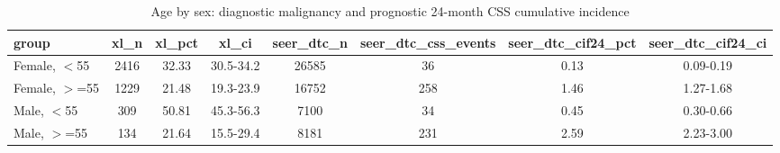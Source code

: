 \begin{table}[htbp]
\caption{Age by sex: diagnostic malignancy and prognostic 24-month CSS cumulative incidence}\label{tab:s16_age_sex}
\scriptsize
\begin{tabular*}{\textwidth}{@{\extracolsep{\fill}}lccccccc@{}}
\toprule
group & xl\_n & xl\_pct & xl\_ci & seer\_dtc\_n & seer\_dtc\_css\_events & seer\_dtc\_cif24\_pct & seer\_dtc\_cif24\_ci \\
\midrule
Female, $<$55 & 2416 & 32.33 & 30.5-34.2 & 26585 & 36 & 0.13 & 0.09-0.19 \\
Female, $>$=55 & 1229 & 21.48 & 19.3-23.9 & 16752 & 258 & 1.46 & 1.27-1.68 \\
Male, $<$55 & 309 & 50.81 & 45.3-56.3 & 7100 & 34 & 0.45 & 0.30-0.66 \\
Male, $>$=55 & 134 & 21.64 & 15.5-29.4 & 8181 & 231 & 2.59 & 2.23-3.00 \\
\bottomrule
\end{tabular*}
\end{table}
